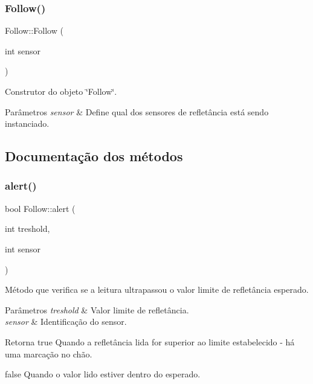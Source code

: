\subsubsection{\texorpdfstring{Follow()}{Follow()}}
{\footnotesize\ttfamily Follow\+::\+Follow (\begin{DoxyParamCaption}\item[{int}]{sensor }\end{DoxyParamCaption})}



Construtor do objeto \char`\"{}\+Follow\char`\"{}. 


\begin{DoxyParams}{Parâmetros}
{\em sensor} & Define qual dos sensores de refletância está sendo instanciado. \\
\hline
\end{DoxyParams}


\subsection{Documentação dos métodos}
\mbox{\label{class_follow_af29fb2cc78da7fb644583becd37c2570}} 
\subsubsection{\texorpdfstring{alert()}{alert()}}
{\footnotesize\ttfamily bool Follow\+::alert (\begin{DoxyParamCaption}\item[{int}]{treshold,  }\item[{int}]{sensor }\end{DoxyParamCaption})}



Método que verifica se a leitura ultrapassou o valor limite de refletância esperado. 


\begin{DoxyParams}{Parâmetros}
{\em treshold} & Valor limite de refletância. \\
\hline
{\em sensor} & Identificação do sensor. \\
\hline
\end{DoxyParams}
\begin{DoxyReturn}{Retorna}
true Quando a refletância lida for superior ao limite estabelecido -\/ há uma marcação no chão. 

false Quando o valor lido estiver dentro do esperado. 
\end{DoxyReturn}
\mbox{\label{class_follow_a56dc95b9da7e5fb9ab443d5fd6165c73}} 
